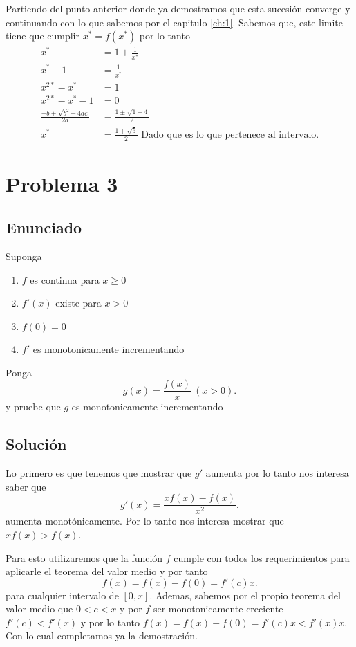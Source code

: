 \documentclass{report}
\begin{document}
Partiendo del punto anterior donde ya demostramos que esta sucesión converge y continuando con lo que sabemos por el capitulo \ref{ch:1}. Sabemos que, este limite tiene que cumplir  $x^{*} = f\left( x^{*} \right) $ por lo tanto
\begin{align*}
  x^{*} &= 1 + \frac{1}{x^{*}}\\
  x^{*} - 1 &= \frac{1}{x^{*}} \\
  x^{2*} - x^{*} &= 1 \\
  x^{2*} - x^{*} - 1 &= 0\\
 \frac{-b \pm \sqrt{b^2 - 4ac} }{2a} &= \frac{1 \pm \sqrt{1 + 4} }{2} \\
 x^{*} &= \frac{1 + \sqrt{5} }{2}\text{ Dado que es lo que pertenece al intervalo}
.\end{align*}

\chapter{Problema 3}
\section{Enunciado}
Suponga 
\begin{enumerate}
  \item $f$ es continua para $x \ge 0 $
  \item $f'\left( x \right) $ existe para $x > 0$
  \item $f\left( 0 \right)  = 0$ 
  \item $f'$ es monotonicamente incrementando
\end{enumerate}

Ponga \[
g\left( x \right) = \frac{f\left( x \right) }{x}\ \left( x > 0 \right) 
.\] y pruebe que $g$ es monotonicamente incrementando

\section{Solución}

Lo primero es que tenemos que mostrar que $g'$ aumenta por lo tanto nos interesa saber que \[
  g'\left( x \right) = \frac{xf\left( x \right) - f\left( x \right) }{x^2}
.\] aumenta monotónicamente.  Por lo tanto nos interesa mostrar que $xf\left( x \right) > f\left( x \right)$.

Para esto utilizaremos que la función $f$ cumple con todos los requerimientos para aplicarle el teorema del valor medio y por tanto \[
f\left( x \right) = f\left( x \right) - f\left( 0 \right) = f'\left( c \right) x
.\] para cualquier intervalo de $\left[ 0, x \right] $. Ademas, sabemos por el propio teorema del valor medio que $0 < c < x$ y por $f$ ser monotonicamente creciente $f'\left( c \right) < f'\left( x \right) $ y por lo tanto $f\left( x \right) = f\left( x \right) - f\left( 0 \right) = f'\left( c \right) x < f'\left( x \right) x$. Con lo cual completamos ya la demostración.
\end{document}
